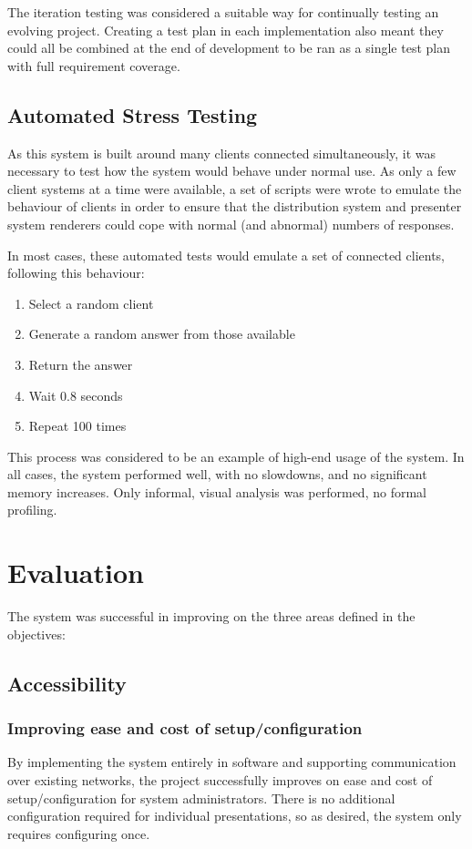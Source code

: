 \documentclass[a4papert,11pt,notitlepage]{article}
\begin{document}
The iteration testing was considered a suitable way for continually testing an evolving project. Creating a test plan in each implementation also meant they could all be combined at the end of development to be ran as a single test plan with full requirement coverage.

\subsection{Automated Stress Testing}
As this system is built around many clients connected simultaneously, it was necessary to test how the system would behave under normal use. As only a few client systems at a time were available, a set of scripts were wrote to emulate the behaviour of clients in order to ensure that the distribution system and presenter system renderers could cope with normal (and abnormal) numbers of responses.

In most cases, these automated tests would emulate a set of connected clients, following this behaviour:
\begin{enumerate}
\item Select a random client
\item Generate a random answer from those available
\item Return the answer
\item Wait 0.8 seconds
\item Repeat 100 times
\end{enumerate}

This process was considered to be an example of high-end usage of the system. In all cases, the system performed well, with no slowdowns, and no significant memory increases. Only informal, visual analysis was performed, no formal profiling.

\pagebreak
\section{Evaluation}
The system was successful in improving on the three areas defined in the objectives:

\subsection{Accessibility}
\subsubsection{Improving ease and cost of setup/configuration}
By implementing the system entirely in software and supporting communication over existing networks, the project successfully improves on ease and cost of setup/configuration for system administrators. There is no additional configuration required for individual presentations, so as desired, the system only requires configuring once.
\end{document}
